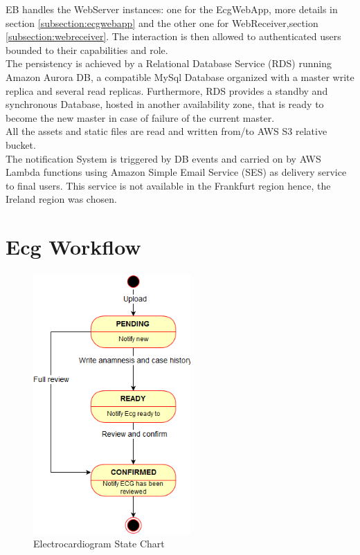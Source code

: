 EB handles the WebServer instances: one for the EcgWebApp, more details in section \ref{subsection:ecgwebapp} and the other one for WebReceiver,section \ref{subsection:webreceiver}. The interaction is then allowed to authenticated users bounded to their capabilities and role.\\
The persistency is achieved by a Relational Database Service (RDS) running Amazon Aurora DB, a compatible MySql Database organized with a master write replica and several read replicas.
Furthermore, RDS provides a standby and synchronous Database, hosted in another availability zone, that is ready to become the new master in case of failure of the current master.\\
All the assets and static files are read and written from/to AWS S3 relative bucket.\\
The notification System is triggered by DB events and carried on by AWS Lambda functions using Amazon Simple Email Service (SES) as delivery service to final users. This service is not available in the Frankfurt region hence, the Ireland region was chosen.


\section{Ecg Workflow}


\begin{figure} %
    \centering
    \includegraphics[width=6cm]{img/ECGstatechart}
    \caption{Electrocardiogram State Chart}
    \label{fig:ECGstatechart}
\end{figure}
 
